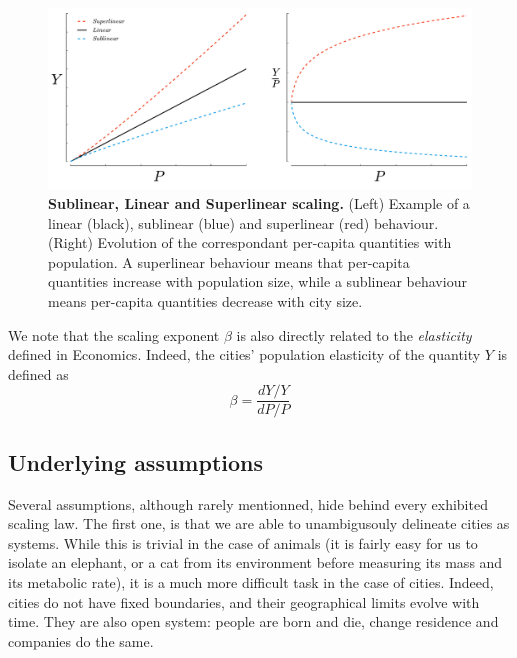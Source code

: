 \begin{figure}[!h]
    \centering
    \includegraphics[width=\textwidth]{gfx/chapter-scaling/scaling_scheme.pdf}
    \caption{{\bf Sublinear, Linear and Superlinear scaling.} (Left) Example of a linear (black), sublinear (blue) and superlinear (red)
    behaviour. (Right) Evolution of the correspondant per-capita quantities with
population. A superlinear behaviour means that per-capita quantities increase with
population size, while a sublinear behaviour means per-capita quantities
decrease with city size.\label{fig:scaling_scheme}}
\end{figure}


We note that the scaling exponent $\beta$ is also directly related to the \emph{elasticity}
defined in Economics. Indeed, the cities' population elasticity of the quantity
$Y$ is defined as\\

\begin{equation}
    \beta = \frac{dY/Y}{dP/P}
\end{equation}


\subsection{Underlying assumptions}
\label{sub:underlying_asumptions}


Several assumptions, although rarely mentionned, hide behind every exhibited
scaling law. The first one, is that we are able to unambigusouly
delineate cities as systems.  While this is trivial in the case of animals (it
is fairly easy for us to isolate an elephant, or a cat from its environment
before 
measuring its mass and its metabolic rate), it is a much more difficult task in
the case of cities. Indeed, cities do not have fixed boundaries, and their 
geographical limits evolve with time. They are also open system:
people are born and die, change residence and companies do the same. 

